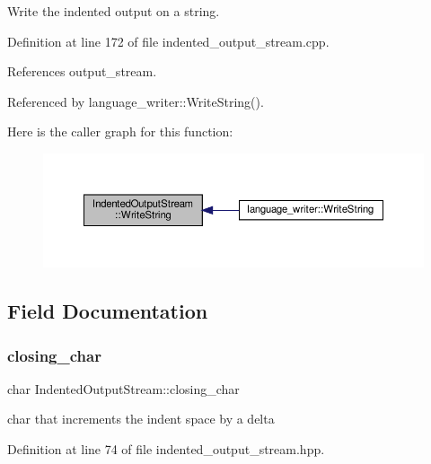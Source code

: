 Write the indented output on a string. 



Definition at line 172 of file indented\+\_\+output\+\_\+stream.\+cpp.



References output\+\_\+stream.



Referenced by language\+\_\+writer\+::\+Write\+String().

Here is the caller graph for this function\+:
\nopagebreak
\begin{figure}[H]
\begin{center}
\leavevmode
\includegraphics[width=350pt]{d4/d62/classIndentedOutputStream_a69a252892d688978533206a3cca900bb_icgraph}
\end{center}
\end{figure}


\subsection{Field Documentation}
\mbox{\label{classIndentedOutputStream_a6cd40928cb1d7089072b57486c7f8d75}} 
\subsubsection{\texorpdfstring{closing\+\_\+char}{closing\_char}}
{\footnotesize\ttfamily char Indented\+Output\+Stream\+::closing\+\_\+char\hspace{0.3cm}{\ttfamily [private]}}



char that increments the indent space by a delta 



Definition at line 74 of file indented\+\_\+output\+\_\+stream.\+hpp.



